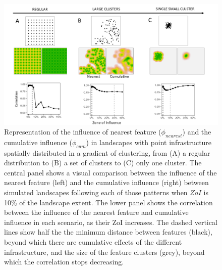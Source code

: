 \documentclass[titlepage]{article}
\begin{document}
\begin{figure}[h]
\centering
\includegraphics[width=1.3\textwidth,center]{figures/simulated_landscapes.png}
\caption{\label{fig:simulated_landscapes} Representation of the influence of nearest feature ($\phi_{nearest}$) and the cumulative influence ($\phi_{cum}$) in landscapes with point infrastructure spatially distributed in a gradient of clustering, from (A) a regular distribution 
to (B) a set of clusters 
to (C) only one cluster. 
The central panel shows  a visual comparison between the influence of the nearest feature (left) and the cumulative influence (right) between simulated landscapes following each of those patterns when $ZoI$ is 10\% of the landscape extent. The lower panel shows the correlation between the influence of the nearest feature and cumulative influence in each scenario, as their ZoI increases. The dashed vertical lines show half the the minimum distance between features (black), beyond which there are cumulative effects of the different infrastructure, and the size of the feature clusters (grey), beyond which the correlation stops decreasing.}
\end{figure}
\end{document}
